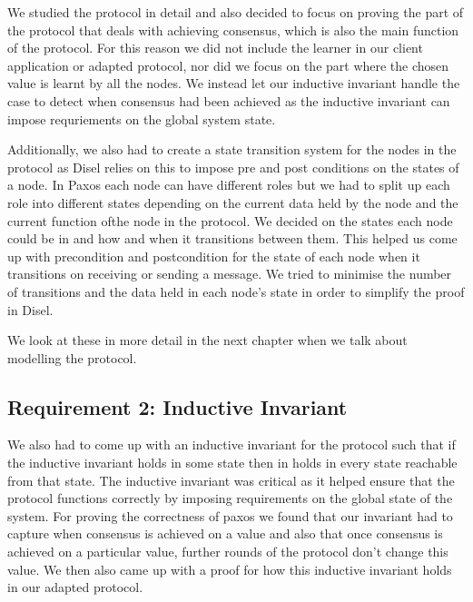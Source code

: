 We studied the protocol in detail and also decided to focus on proving the
part of the protocol that deals with achieving consensus, which is also the
main function of the protocol. For this reason we did not include the learner
in our client application or adapted protocol, nor did we focus on the part
where the chosen value is learnt by all the nodes. We instead let our inductive
invariant handle the case to detect when consensus had been achieved as the
inductive invariant can impose requriements on the global system state.

Additionally, we also had to create a state transition system for the nodes in
the protocol as Disel relies on this to impose pre and post conditions on the
states of a node. In Paxos
each node can have different roles but we had to split up each role into different
states depending on the current data held by the node and the current function
ofthe node in the protocol. We decided on the states each node could be in and
how and when it transitions between them. This helped us come up with precondition
and postcondition for the state of each node when it transitions on receiving or
sending a message. We tried to minimise the number of transitions and the data
held in each node’s state in order to simplify the proof in Disel.

We look at these in more detail in the next chapter when we talk about modelling
the protocol.

\subsection{Requirement 2: Inductive Invariant}
We also had to come up with an inductive invariant for the protocol such that if
the inductive invariant holds in some state then in holds in every state reachable
from that state. The inductive invariant was critical as it helped ensure that
the protocol functions correctly by imposing requirements on the global state of
the system. For proving the correctness of paxos we found that our invariant had
to capture when consensus is achieved on a value and also that once consensus is
achieved on a particular value, further rounds of the protocol don’t change this
value. We then also came up with a proof for how this inductive invariant holds
in our adapted protocol.

